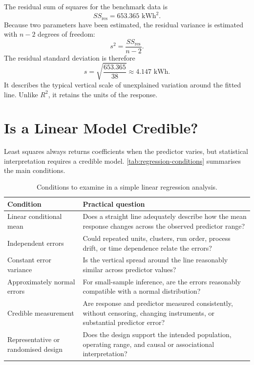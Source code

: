 \FloatBarrier

The residual sum of squares for the benchmark data is
\[
SS_{\text{res}}=653.365\text{ kWh}^2.
\]
Because two parameters have been estimated, the residual variance is estimated with $n-2$ degrees of freedom:
\[
s^2=\frac{SS_{\text{res}}}{n-2}.
\]
The residual standard deviation is therefore
\[
s
=\sqrt{\frac{653.365}{38}}
\approx4.147\text{ kWh}.
\]
It describes the typical vertical scale of unexplained variation around the fitted line. Unlike $R^2$, it retains the units of the response.

\section{Is a Linear Model Credible?}
\label{sec:regression-diagnostics}

Least squares always returns coefficients when the predictor varies, but statistical interpretation requires a credible model. \autoref{tab:regression-conditions} summarises the main conditions.

\begin{table}[htbp]
\centering
\caption{Conditions to examine in a simple linear regression analysis.}
\label{tab:regression-conditions}
\begin{tabularx}{\textwidth}{@{}l>{\raggedright\arraybackslash}X@{}}
\toprule
Condition & Practical question \\
\midrule
Linear conditional mean & Does a straight line adequately describe how the mean response changes across the observed predictor range? \\
Independent errors & Could repeated units, clusters, run order, process drift, or time dependence relate the errors? \\
Constant error variance & Is the vertical spread around the line reasonably similar across predictor values? \\
Approximately normal errors & For small-sample inference, are the errors reasonably compatible with a normal distribution? \\
Credible measurement & Are response and predictor measured consistently, without censoring, changing instruments, or substantial predictor error? \\
Representative or randomised design & Does the design support the intended population, operating range, and causal or associational interpretation? \\
\bottomrule
\end{tabularx}
\end{table}

